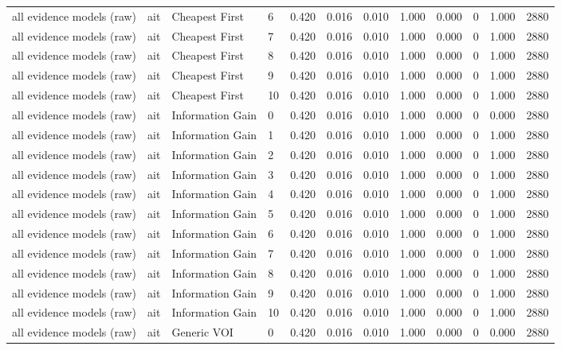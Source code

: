 \begin{table}[!ht]
{\begin{tabular}{llllllllllll}
all evidence models (raw) & ait & Cheapest First & 6 & 0.420 & 0.016 & 0.010 & 1.000 & 0.000 & 0 & 1.000 & 2880 \\
all evidence models (raw) & ait & Cheapest First & 7 & 0.420 & 0.016 & 0.010 & 1.000 & 0.000 & 0 & 1.000 & 2880 \\
all evidence models (raw) & ait & Cheapest First & 8 & 0.420 & 0.016 & 0.010 & 1.000 & 0.000 & 0 & 1.000 & 2880 \\
all evidence models (raw) & ait & Cheapest First & 9 & 0.420 & 0.016 & 0.010 & 1.000 & 0.000 & 0 & 1.000 & 2880 \\
all evidence models (raw) & ait & Cheapest First & 10 & 0.420 & 0.016 & 0.010 & 1.000 & 0.000 & 0 & 1.000 & 2880 \\
all evidence models (raw) & ait & Information Gain & 0 & 0.420 & 0.016 & 0.010 & 1.000 & 0.000 & 0 & 0.000 & 2880 \\
all evidence models (raw) & ait & Information Gain & 1 & 0.420 & 0.016 & 0.010 & 1.000 & 0.000 & 0 & 1.000 & 2880 \\
all evidence models (raw) & ait & Information Gain & 2 & 0.420 & 0.016 & 0.010 & 1.000 & 0.000 & 0 & 1.000 & 2880 \\
all evidence models (raw) & ait & Information Gain & 3 & 0.420 & 0.016 & 0.010 & 1.000 & 0.000 & 0 & 1.000 & 2880 \\
all evidence models (raw) & ait & Information Gain & 4 & 0.420 & 0.016 & 0.010 & 1.000 & 0.000 & 0 & 1.000 & 2880 \\
all evidence models (raw) & ait & Information Gain & 5 & 0.420 & 0.016 & 0.010 & 1.000 & 0.000 & 0 & 1.000 & 2880 \\
all evidence models (raw) & ait & Information Gain & 6 & 0.420 & 0.016 & 0.010 & 1.000 & 0.000 & 0 & 1.000 & 2880 \\
all evidence models (raw) & ait & Information Gain & 7 & 0.420 & 0.016 & 0.010 & 1.000 & 0.000 & 0 & 1.000 & 2880 \\
all evidence models (raw) & ait & Information Gain & 8 & 0.420 & 0.016 & 0.010 & 1.000 & 0.000 & 0 & 1.000 & 2880 \\
all evidence models (raw) & ait & Information Gain & 9 & 0.420 & 0.016 & 0.010 & 1.000 & 0.000 & 0 & 1.000 & 2880 \\
all evidence models (raw) & ait & Information Gain & 10 & 0.420 & 0.016 & 0.010 & 1.000 & 0.000 & 0 & 1.000 & 2880 \\
all evidence models (raw) & ait & Generic VOI & 0 & 0.420 & 0.016 & 0.010 & 1.000 & 0.000 & 0 & 0.000 & 2880 \\

\end{tabular}}
\end{table}
